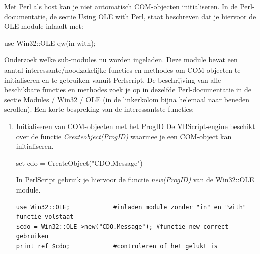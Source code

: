\documentclass[11pt,a4paper]{report}
\begin{document}
\par Met Perl als host kan je niet automatisch COM-objecten initialiseren. In de Perl-documentatie, de sectie Using OLE with Perl, staat beschreven dat je hiervoor de OLE-module inlaadt met:
\par use Win32::OLE qw(in  with);
\par Onderzoek welke sub-modules nu worden ingeladen.
Deze module bevat een aantal interessante/noodzakelijke functies en methodes om COM objecten te initialiseren en te gebruiken vanuit Perlscript. De beschrijving van alle beschikbare functies en methodes zoek je op in dezelfde Perl-documentatie in de sectie Modules / Win32 / OLE (in de linkerkolom bijna helemaal naar beneden scrollen).
Een korte bespreking van de interessantste functies:
\begin{enumerate}[resume]
\item Initialiseren van COM-objecten met het ProgID
De VBScript-engine beschikt over de functie \textit{Createobject(ProgID)} waarmee je een COM-object kan initialiseren.
\par set cdo = CreateObject("CDO.Message")
\par In PerlScript gebruik je hiervoor de functie \textit{new(ProgID)} van de Win32::OLE module.
\begin{lstlisting}
use Win32::OLE;            #inladen module zonder "in" en "with" functie volstaat
$cdo = Win32::OLE->new("CDO.Message"); #functie new correct gebruiken
print ref $cdo;            #controleren of het gelukt is    
\end{lstlisting}
\end{enumerate}
\end{document}
